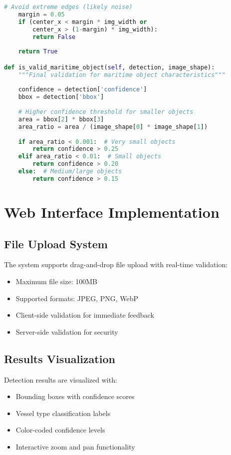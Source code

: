 \documentclass[12pt,a4paper]{report}
\begin{document}
\begin{lstlisting}[language=Python, caption=Advanced Maritime Context Filter]
    # Avoid extreme edges (likely noise)
    margin = 0.05
    if (center_x < margin * img_width or 
        center_x > (1-margin) * img_width):
        return False
        
    return True

def is_valid_maritime_object(self, detection, image_shape):
    """Final validation for maritime object characteristics"""
    
    confidence = detection['confidence']
    bbox = detection['bbox']
    
    # Higher confidence threshold for smaller objects
    area = bbox[2] * bbox[3]
    area_ratio = area / (image_shape[0] * image_shape[1])
    
    if area_ratio < 0.001:  # Very small objects
        return confidence > 0.25
    elif area_ratio < 0.01:  # Small objects  
        return confidence > 0.20
    else:  # Medium/large objects
        return confidence > 0.15
\end{lstlisting}

\section{Web Interface Implementation}

\subsection{File Upload System}
The system supports drag-and-drop file upload with real-time validation:
\begin{itemize}
    \item Maximum file size: 100MB
    \item Supported formats: JPEG, PNG, WebP
    \item Client-side validation for immediate feedback
    \item Server-side validation for security
\end{itemize}

\subsection{Results Visualization}
Detection results are visualized with:
\begin{itemize}
    \item Bounding boxes with confidence scores
    \item Vessel type classification labels
    \item Color-coded confidence levels
    \item Interactive zoom and pan functionality
\end{itemize}
\end{document}
